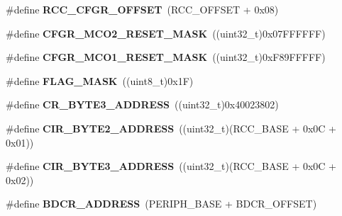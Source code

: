 \begin{DoxyCompactItemize}
\item 
\mbox{\label{group___r_c_c_gafb1e90a88869585b970749de3c16ce4a}} 
\#define {\bfseries R\+C\+C\+\_\+\+C\+F\+G\+R\+\_\+\+O\+F\+F\+S\+ET}~(R\+C\+C\+\_\+\+O\+F\+F\+S\+ET + 0x08)
\item 
\mbox{\label{group___r_c_c_gabd7dd9cf31a9cc27fd9c0c1624f9a298}} 
\#define {\bfseries C\+F\+G\+R\+\_\+\+M\+C\+O2\+\_\+\+R\+E\+S\+E\+T\+\_\+\+M\+A\+SK}~((uint32\+\_\+t)0x07\+F\+F\+F\+F\+F\+F)
\item 
\mbox{\label{group___r_c_c_ga51f5130a66963090dc02b4ebd47e2f83}} 
\#define {\bfseries C\+F\+G\+R\+\_\+\+M\+C\+O1\+\_\+\+R\+E\+S\+E\+T\+\_\+\+M\+A\+SK}~((uint32\+\_\+t)0x\+F89\+F\+F\+F\+F\+F)
\item 
\mbox{\label{group___r_c_c_ga890221cb651a3f30f6d1bca0d9b0e13d}} 
\#define {\bfseries F\+L\+A\+G\+\_\+\+M\+A\+SK}~((uint8\+\_\+t)0x1\+F)
\item 
\mbox{\label{group___r_c_c_ga9b2724575bb34217aeddcb69c41a1547}} 
\#define {\bfseries C\+R\+\_\+\+B\+Y\+T\+E3\+\_\+\+A\+D\+D\+R\+E\+SS}~((uint32\+\_\+t)0x40023802)
\item 
\mbox{\label{group___r_c_c_gaab58c3f3f81bf1ab9a14cf3fececd8c4}} 
\#define {\bfseries C\+I\+R\+\_\+\+B\+Y\+T\+E2\+\_\+\+A\+D\+D\+R\+E\+SS}~((uint32\+\_\+t)(R\+C\+C\+\_\+\+B\+A\+SE + 0x0\+C + 0x01))
\item 
\mbox{\label{group___r_c_c_ga43f47430582c9575970901533e525bb5}} 
\#define {\bfseries C\+I\+R\+\_\+\+B\+Y\+T\+E3\+\_\+\+A\+D\+D\+R\+E\+SS}~((uint32\+\_\+t)(R\+C\+C\+\_\+\+B\+A\+SE + 0x0\+C + 0x02))
\item 
\mbox{\label{group___r_c_c_ga40b5a415d697b6af7babd8a208c92435}} 
\#define {\bfseries B\+D\+C\+R\+\_\+\+A\+D\+D\+R\+E\+SS}~(P\+E\+R\+I\+P\+H\+\_\+\+B\+A\+SE + B\+D\+C\+R\+\_\+\+O\+F\+F\+S\+ET)
\end{DoxyCompactItemize}
